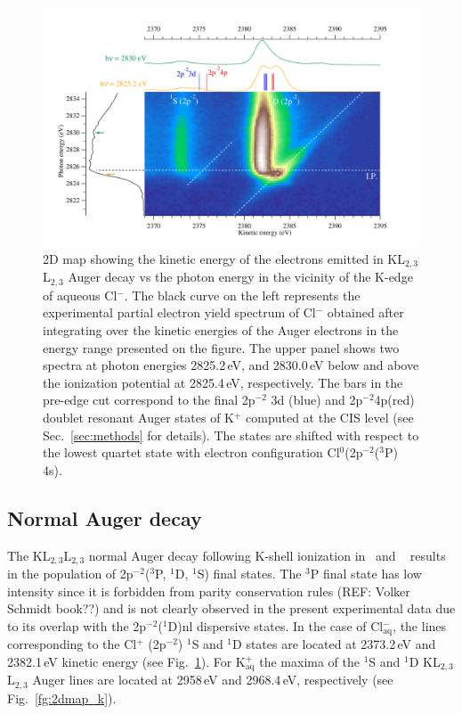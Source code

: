\begin{figure}%
\centering
\includegraphics[scale=0.55]{figures/cl_2dmap.pdf}
\caption{2D map showing the kinetic energy of the electrons emitted in KL$_{2,3}$L$_{2,3}$ Auger decay vs the photon energy in the vicinity of the K-edge of aqueous Cl$^{-}$. The black curve on the left represents the experimental partial electron yield spectrum of Cl$^{-}$ obtained after integrating over the kinetic energies of the Auger electrons in the energy range presented on the figure. The upper panel shows two spectra at photon energies 2825.2\,eV, and 2830.0\,eV below and above the ionization potential at 2825.4\,eV, respectively. The bars in the pre-edge cut correspond to the final 2p$^{-2}$ 3d (blue) and 2p$^{-2}$4p(red) doublet resonant Auger states of K$^{+}$ computed at the CIS level (see Sec.\ \ref{sec:methods} for details). The states are shifted with respect to the lowest quartet state with electron configuration Cl$^{0}$(2p$^{-2}$($^3$P) 4s).}
\label{fg:2dmap_cl}
\end{figure}


\subsection{Normal Auger decay}\label{ssec:na}

The KL$_{2,3}$L$_{2,3}$ normal Auger decay following K-shell ionization in \ki~and \cli~ results in the population of 2p$^{-2}$($^3$P, $^1$D, $^1$S) final states. The $^3$P final state has low intensity since it is forbidden {\color{red}from parity conservation rules} (REF: Volker Schmidt book??) and is not clearly observed in the present experimental data due to its overlap with the 2p$^{-2}$($^{1}$D)nl dispersive states. In the case of Cl$^{-}_{\text{aq}}$, the lines corresponding to the Cl$^{+}$ (2p$^{-2}$) $^1$S and $^1$D states are located at 2373.2\,eV and 2382.1\,eV kinetic energy (see Fig.\ \ref{fg:2dmap_cl}). For K$^{+}_{\text{aq}}$ the maxima of the $^1$S and $^1$D KL$_{2,3}$L$_{2,3}$ Auger lines are located at 2958\,eV and 2968.4\,eV, respectively (see Fig.\ \ref{fg:2dmap_k}). 


